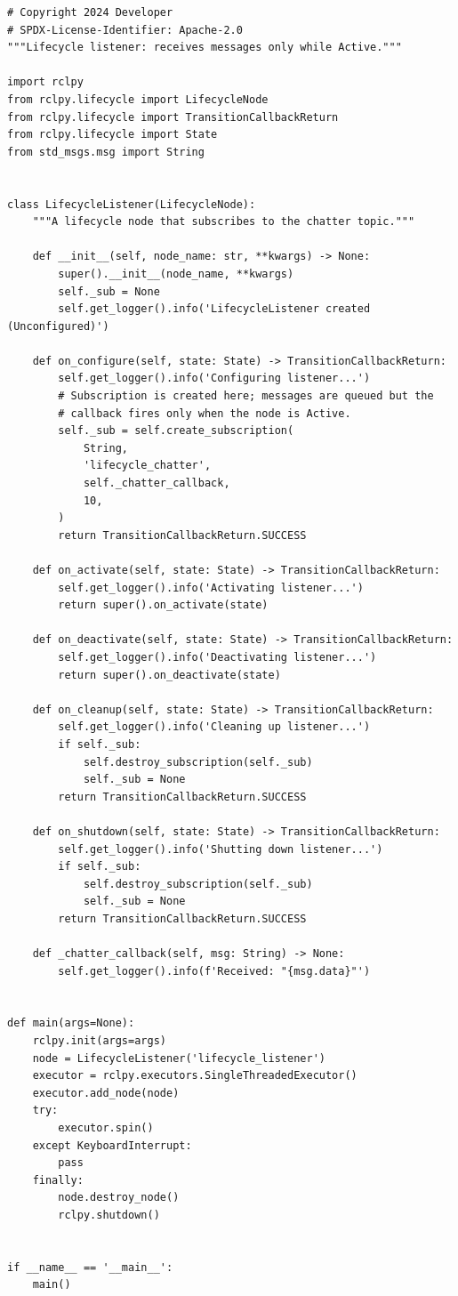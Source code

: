 \documentclass[12pt,a4paper]{article}
\begin{document}
\begin{lstlisting}[style=python,caption={lifecycle\_listener.py}]
# Copyright 2024 Developer
# SPDX-License-Identifier: Apache-2.0
"""Lifecycle listener: receives messages only while Active."""

import rclpy
from rclpy.lifecycle import LifecycleNode
from rclpy.lifecycle import TransitionCallbackReturn
from rclpy.lifecycle import State
from std_msgs.msg import String


class LifecycleListener(LifecycleNode):
    """A lifecycle node that subscribes to the chatter topic."""

    def __init__(self, node_name: str, **kwargs) -> None:
        super().__init__(node_name, **kwargs)
        self._sub = None
        self.get_logger().info('LifecycleListener created (Unconfigured)')

    def on_configure(self, state: State) -> TransitionCallbackReturn:
        self.get_logger().info('Configuring listener...')
        # Subscription is created here; messages are queued but the
        # callback fires only when the node is Active.
        self._sub = self.create_subscription(
            String,
            'lifecycle_chatter',
            self._chatter_callback,
            10,
        )
        return TransitionCallbackReturn.SUCCESS

    def on_activate(self, state: State) -> TransitionCallbackReturn:
        self.get_logger().info('Activating listener...')
        return super().on_activate(state)

    def on_deactivate(self, state: State) -> TransitionCallbackReturn:
        self.get_logger().info('Deactivating listener...')
        return super().on_deactivate(state)

    def on_cleanup(self, state: State) -> TransitionCallbackReturn:
        self.get_logger().info('Cleaning up listener...')
        if self._sub:
            self.destroy_subscription(self._sub)
            self._sub = None
        return TransitionCallbackReturn.SUCCESS

    def on_shutdown(self, state: State) -> TransitionCallbackReturn:
        self.get_logger().info('Shutting down listener...')
        if self._sub:
            self.destroy_subscription(self._sub)
            self._sub = None
        return TransitionCallbackReturn.SUCCESS

    def _chatter_callback(self, msg: String) -> None:
        self.get_logger().info(f'Received: "{msg.data}"')


def main(args=None):
    rclpy.init(args=args)
    node = LifecycleListener('lifecycle_listener')
    executor = rclpy.executors.SingleThreadedExecutor()
    executor.add_node(node)
    try:
        executor.spin()
    except KeyboardInterrupt:
        pass
    finally:
        node.destroy_node()
        rclpy.shutdown()


if __name__ == '__main__':
    main()
\end{lstlisting}
\end{document}
